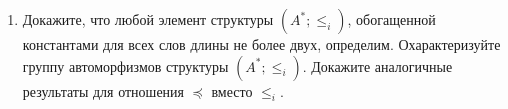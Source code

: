 \documentclass[a4paper,11pt]{article}
\begin{document}
\begin{enumerate}
	\item Докажите, что любой элемент структуры $(A^*;\leq_i)$, обогащенной константами для всех слов длины не более двух, определим. Охарактеризуйте группу автоморфизмов структуры $(A^*;\leq_i)$. Докажите аналогичные результаты для отношения $\preceq$ вместо $\leq_i$.

\end{enumerate}
\end{document}
